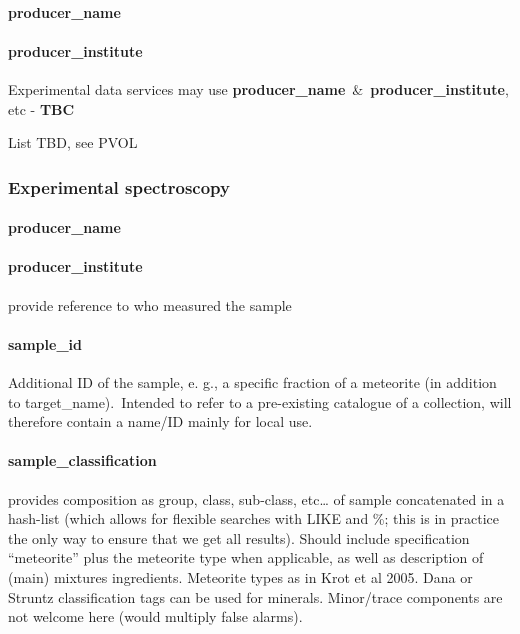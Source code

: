 \documentclass[11pt,a4paper]{ivoa}
\begin{document}
\paragraph{producer\_name}

\paragraph{producer\_institute\\}

Experimental data services may use \textbf{producer\_name} \& \textbf{producer\_institute}, etc - \textbf{TBC}

List TBD, see PVOL

\subsubsection{Experimental spectroscopy\\}

\paragraph{producer\_name}

\paragraph{producer\_institute}

provide reference to who measured the sample

\paragraph{sample\_id}

Additional ID of the sample, e. g., a specific fraction of a meteorite (in addition to target\_name). Intended to refer to a pre-existing catalogue of a collection, will therefore contain a name/ID mainly for local use. 

\paragraph{sample\_classification}

provides composition as group, class, sub-class, etc… of sample concatenated in a hash-list (which allows for flexible searches with LIKE and \%; this is in practice the only way to ensure that we get all results). Should include specification ``meteorite'' plus the meteorite type when applicable, as well as description of (main) mixtures ingredients. Meteorite types as in Krot et al 2005. Dana or Struntz classification tags can be used for minerals. Minor/trace components are not welcome here (would multiply false alarms).
\end{document}
